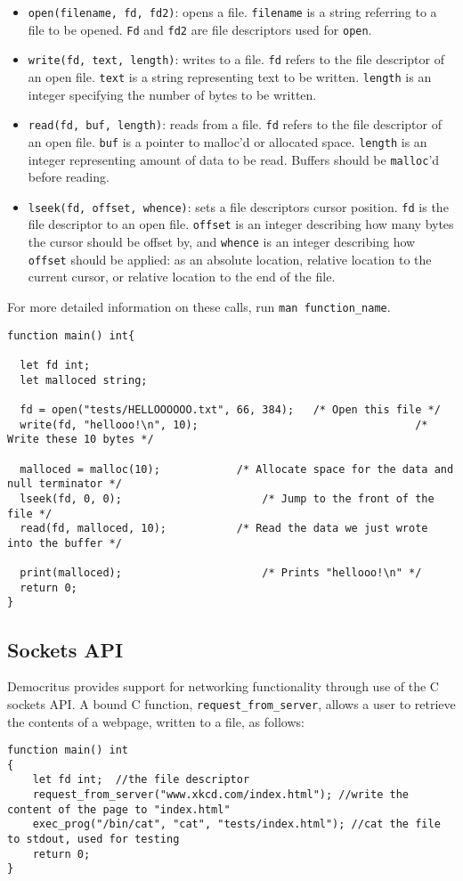 		\begin{itemize}
			\item \texttt{open(filename, fd, fd2)}: opens a file. \texttt{filename} is a string referring to a file to be opened. \texttt{Fd} and \texttt{fd2} are file descriptors used for \texttt{open}.
			\item \texttt{write(fd, text, length)}: writes to a file. \texttt{fd} refers to the file descriptor of an open file. \texttt{text} is a string representing text to be written. \texttt{length} is an integer specifying the number of bytes to be written.
			\item \texttt{read(fd, buf, length)}: reads from a file. \texttt{fd} refers to the file descriptor of an open file. \texttt{buf} is a pointer to malloc'd or allocated space. \texttt{length} is an integer representing amount of data to be read. Buffers should be \texttt{malloc}'d before reading. 
			\item \texttt{lseek(fd, offset, whence)}: sets a file descriptors cursor position. \texttt{fd} is the file descriptor to an open file. \texttt{offset} is an integer describing how many bytes the cursor should be offset by, and \texttt{whence} is an integer describing how \texttt{offset} should be applied: as an absolute location, relative location to the current cursor, or relative location to the end of the file.
		\end{itemize}

		\noindent
		For more detailed information on these calls, run \texttt{man function\_name}.

		\begin{lstlisting}
function main() int{

  let fd int;
  let malloced string;
  
  fd = open("tests/HELLOOOOOO.txt", 66, 384); 	/* Open this file */
  write(fd, "hellooo!\n", 10); 									/* Write these 10 bytes */
  
  malloced = malloc(10); 			/* Allocate space for the data and null terminator */
  lseek(fd, 0, 0);						/* Jump to the front of the file */
  read(fd, malloced, 10);			/* Read the data we just wrote into the buffer */
  
  print(malloced);						/* Prints "hellooo!\n" */
  return 0;
}
		\end{lstlisting}

	\subsection{Sockets API}
	Democritus provides support for networking functionality through use of the C sockets API. A bound C function, \texttt{request\_from\_server}, allows a user to retrieve the contents of a webpage, written to a file, as follows:
	
			\begin{lstlisting}
function main() int
{
    let fd int;  //the file descriptor
    request_from_server("www.xkcd.com/index.html"); //write the content of the page to "index.html"
    exec_prog("/bin/cat", "cat", "tests/index.html"); //cat the file to stdout, used for testing 
    return 0;
}
		\end{lstlisting}
